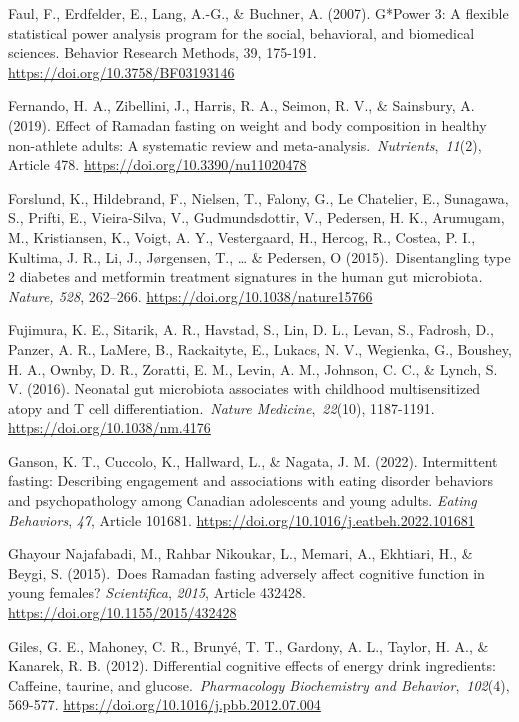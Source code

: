 \documentclass[authordate, empirical]{jote-new-article}
\begin{document}
Faul, F., Erdfelder, E., Lang, A.-G., \& Buchner, A. (2007). G*Power 3: A flexible statistical power analysis program for the social, behavioral, and biomedical sciences. Behavior Research Methods, 39, 175-191. \url{https://doi.org/10.3758/BF03193146}



Fernando, H. A., Zibellini, J., Harris, R. A., Seimon, R. V., \& Sainsbury, A. (2019). Effect of Ramadan fasting on weight and body composition in healthy non-athlete adults: A systematic review and meta-analysis. \emph{Nutrients}, \emph{11}(2), Article 478. \url{https://doi.org/10.3390/nu11020478}



Forslund, K., Hildebrand, F., Nielsen, T., Falony, G., Le Chatelier, E., Sunagawa, S., Prifti, E., Vieira-Silva, V., Gudmundsdottir, V., Pedersen, H. K., Arumugam, M., Kristiansen, K., Voigt, A. Y., Vestergaard, H., Hercog, R., Costea, P. I., Kultima, J. R., Li, J., Jørgensen, T., … \& Pedersen, O (2015). Disentangling type 2 diabetes and metformin treatment signatures in the human gut microbiota\emph{. Nature, 528}, 262--266. \url{https://doi.org/10.1038/nature15766}



Fujimura, K. E., Sitarik, A. R., Havstad, S., Lin, D. L., Levan, S., Fadrosh, D., Panzer, A. R., LaMere, B., Rackaityte, E., Lukacs, N. V., Wegienka, G., Boushey, H. A., Ownby, D. R., Zoratti, E. M., Levin, A. M., Johnson, C. C., \& Lynch, S. V. (2016). Neonatal gut microbiota associates with childhood multisensitized atopy and T cell differentiation. \emph{Nature Medicine}, \emph{22}(10), 1187-1191. \url{https://doi.org/10.1038/nm.4176}



Ganson, K. T., Cuccolo, K., Hallward, L., \& Nagata, J. M. (2022). Intermittent fasting: Describing engagement and associations with eating disorder behaviors and psychopathology among Canadian adolescents and young adults. \emph{Eating Behaviors}, \emph{47}, Article 101681. \href{https://doi.org/10.1016/j.eatbeh.2022.101681}{https://doi.org/10.1016/j.eatbeh.2022.101681}



Ghayour Najafabadi, M., Rahbar Nikoukar, L., Memari, A., Ekhtiari, H., \& Beygi, S. (2015). Does Ramadan fasting adversely affect cognitive function in young females?\emph{ Scientifica}, \emph{2015}, Article 432428. \url{https://doi.org/10.1155/2015/432428}



Giles, G. E., Mahoney, C. R., Brunyé, T. T., Gardony, A. L., Taylor, H. A., \& Kanarek, R. B. (2012). Differential cognitive effects of energy drink ingredients: Caffeine, taurine, and glucose. \emph{Pharmacology Biochemistry and Behavior}, \emph{102}(4), 569-577. \url{https://doi.org/10.1016/j.pbb.2012.07.004}
\end{document}

